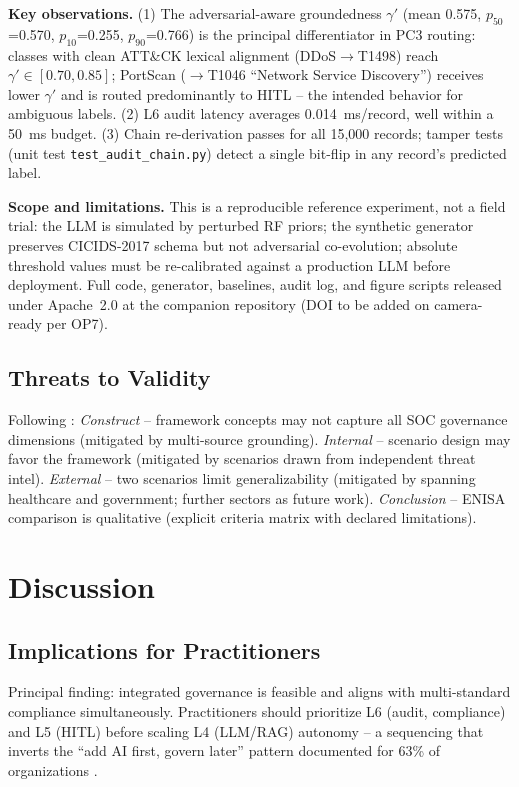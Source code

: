 \documentclass[journal]{IEEEtran}
\begin{document}
\textbf{Key observations.} (1) The adversarial-aware groundedness $\gamma'$ (mean 0.575,
$p_{50}$=0.570, $p_{10}$=0.255, $p_{90}$=0.766) is the principal differentiator in PC3
routing: classes with clean ATT\&CK lexical alignment (DDoS$\to$T1498) reach
$\gamma' \in [0.70, 0.85]$; PortScan ($\to$T1046 ``Network Service Discovery'') receives
lower $\gamma'$ and is routed predominantly to HITL -- the intended behavior for
ambiguous labels. (2) L6 audit latency averages 0.014~ms/record, well within a 50~ms budget.
(3) Chain re-derivation passes for all 15{,}000 records; tamper tests (unit test
\texttt{test\_audit\_chain.py}) detect a single bit-flip in any record's predicted label.

\textbf{Scope and limitations.} This is a reproducible reference experiment, not a field
trial: the LLM is simulated by perturbed RF priors; the synthetic generator preserves
CICIDS-2017 schema but not adversarial co-evolution; absolute threshold values must be
re-calibrated against a production LLM before deployment. Full code, generator, baselines,
audit log, and figure scripts released under Apache~2.0 at the companion repository
(DOI to be added on camera-ready per OP7).

\subsection{Threats to Validity}
Following \cite{wohlin2012experimentation}: \emph{Construct} -- framework concepts may not
capture all SOC governance dimensions (mitigated by multi-source grounding). \emph{Internal}
-- scenario design may favor the framework (mitigated by scenarios drawn from independent
threat intel). \emph{External} -- two scenarios limit generalizability (mitigated by spanning
healthcare and government; further sectors as future work). \emph{Conclusion} -- ENISA
comparison is qualitative (explicit criteria matrix with declared limitations).

\section{Discussion}
\label{sec:discussion}

\subsection{Implications for Practitioners}
Principal finding: integrated governance is feasible and aligns with multi-standard compliance
simultaneously. Practitioners should prioritize L6 (audit, compliance) and L5 (HITL) before
scaling L4 (LLM/RAG) autonomy -- a sequencing that inverts the ``add AI first, govern later''
pattern documented for 63\% of organizations \cite{ibm2025costbreach}.
\end{document}
